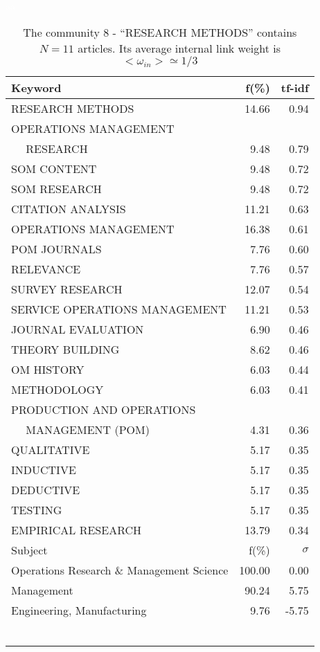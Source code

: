 \documentclass[a4paper,11pt]{report}
\begin{document}
\begin{landscape}
\begin{table}[!ht]
\caption{The community 8 - ``RESEARCH METHODS'' contains $N = 11$ articles. Its average internal link weight is $<\omega_{in}> \simeq 1/3$ }
\textcolor{white}{aa}\\
{\scriptsize\begin{tabular}{|l r  r|}
\hline
Keyword & f(\%) & tf-idf \\
\hline
RESEARCH METHODS & 14.66 & 0.94\\
OPERATIONS MANAGEMENT &  &\\
$\quad$ RESEARCH & 9.48 & 0.79\\
SOM CONTENT & 9.48 & 0.72\\
SOM RESEARCH & 9.48 & 0.72\\
CITATION ANALYSIS & 11.21 & 0.63\\
OPERATIONS MANAGEMENT & 16.38 & 0.61\\
POM JOURNALS & 7.76 & 0.60\\
RELEVANCE & 7.76 & 0.57\\
SURVEY RESEARCH & 12.07 & 0.54\\
SERVICE OPERATIONS MANAGEMENT & 11.21 & 0.53\\
JOURNAL EVALUATION & 6.90 & 0.46\\
THEORY BUILDING & 8.62 & 0.46\\
OM HISTORY & 6.03 & 0.44\\
METHODOLOGY & 6.03 & 0.41\\
PRODUCTION AND OPERATIONS &  &\\
$\quad$ MANAGEMENT (POM) & 4.31 & 0.36\\
QUALITATIVE & 5.17 & 0.35\\
INDUCTIVE & 5.17 & 0.35\\
DEDUCTIVE & 5.17 & 0.35\\
TESTING & 5.17 & 0.35\\
EMPIRICAL RESEARCH & 13.79 & 0.34\\
\hline
\hline
Subject & f(\%) & $\sigma$\\
\hline
Operations Research \& Management Science & 100.00 & 0.00\\
Management & 90.24 & 5.75\\
Engineering, Manufacturing & 9.76 & -5.75\\
 &  & \\
 &  & \\
 &  & \\
 &  & \\
 &  & \\
 &  & \\

\end{tabular}}
\end{table}
\end{landscape}
\end{document}
